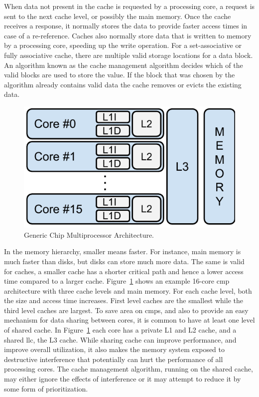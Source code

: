When data not present in the cache is requested by a processing core, a request is sent to the next cache level, or possibly the main memory.
Once the cache receives a response, it normally stores the data to provide faster access times in case of a re-reference.
Caches also normally store data that is written to memory by a processing core, speeding up the write operation.
For a set-associative or fully associative cache, there are multiple valid storage locations for a data block.
An algorithm known as the cache management algorithm decides which of the valid blocks are used to store the value.
If the block that was chosen by the algorithm already contains valid data the cache removes or evicts the existing data.

\begin{figure}[th]
\centering
\includegraphics[scale=.65]{figures/processor_model/processor_model}
\caption{Generic Chip Multiprocessor Architecture.}
\label{fig:cmp_model}
\end{figure}

In the memory hierarchy, smaller means faster. 
For instance, main memory is much faster than disks, but disks can store much more data.
The same is valid for caches, a smaller cache has a shorter critical path and hence a lower access time compared to a larger cache.
Figure~\ref{fig:cmp_model} shows an example 16-core \gls{cmp} architecture with three cache levels and main memory.
For each cache level, both the size and access time increases.
First level caches are the smallest while the third level caches are largest.
To save area on \glspl{cmp}, and also to provide an easy mechanism for data sharing between cores, it is common to have at least one level of shared cache.
In Figure~\ref{fig:cmp_model} each core has a private L1 and L2 cache, and a shared \gls{llc}, the L3 cache.
While sharing cache can improve performance, and improve overall utilization, it also makes the memory system exposed to destructive interference that potentially can hurt the performance of all processing cores. 
The cache management algorithm, running on the shared cache, may either ignore the effects of interference or it may attempt to reduce it by some form of prioritization.

